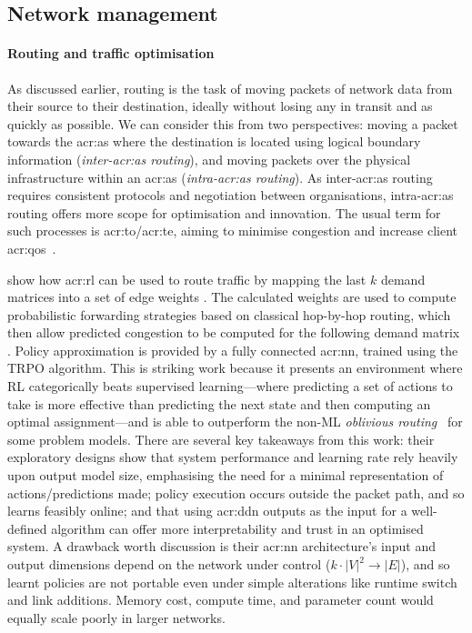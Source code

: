 \subsection{Network management}

\paragraph{Routing and traffic optimisation}
As discussed earlier, routing is the task of moving packets of network data from their source to their destination, ideally without losing any in transit and as quickly as possible.
We can consider this from two perspectives: moving a packet towards the \gls{acr:as} where the destination is located using logical boundary information (\emph{inter-\gls{acr:as} routing}), and moving packets over the physical infrastructure within an \gls{acr:as} (\emph{intra-\gls{acr:as} routing}).
As inter-\gls{acr:as} routing requires consistent protocols and negotiation between organisations, intra-\gls{acr:as} routing offers more scope for optimisation and innovation.
The usual term for such processes is \gls{acr:to}/\gls{acr:te}, aiming to minimise congestion and increase client \gls{acr:qos}~\parencite{rfc3272}.

\textcite{DBLP:conf/hotnets/ValadarskySST17} show how \gls{acr:rl} can be used to route traffic by mapping the last $k$ demand matrices \prllitstate{} into a set of edge weights \prllitactreal.
The calculated weights are used to compute probabilistic forwarding strategies based on classical hop-by-hop routing, which then allow predicted congestion to be computed for the following demand matrix \prllitreward.
Policy approximation is provided by a fully connected \gls{acr:nn}, trained using the TRPO algorithm.
This is striking work because it presents an environment where RL categorically beats supervised learning---where predicting a set of actions to take is more effective than predicting the next state and then computing an optimal assignment---and is able to outperform the non-ML \emph{oblivious routing}~\parencite{DBLP:conf/stoc/AzarCFKR03} for some problem models.
There are several key takeaways from this work: their exploratory designs show that system performance and learning rate rely heavily upon output model size, emphasising the need for a minimal representation of actions/predictions made; policy execution occurs outside the packet path, and so learns feasibly online; and that using \gls{acr:ddn} outputs as the input for a well-defined algorithm can offer more interpretability and trust in an optimised system.
A drawback worth discussion is their \gls{acr:nn} architecture's input and output dimensions depend on the network under control ($k\cdot\left|V\right|^2\rightarrow\left|E\right|$), and so learnt policies are not portable even under simple alterations like runtime switch and link additions.
Memory cost, compute time, and parameter count would equally scale poorly in larger networks.


